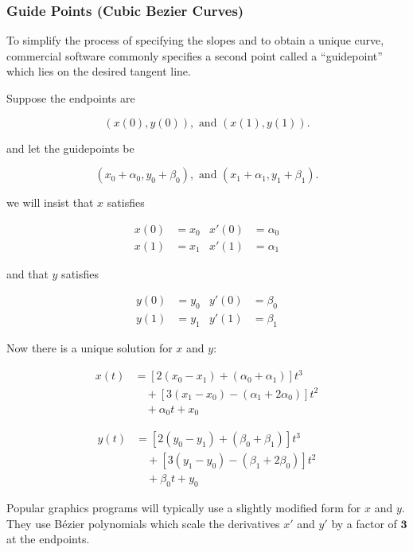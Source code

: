 \subsubsection{Guide Points (Cubic Bezier Curves)}
To simplify the process of specifying the slopes and to obtain a unique curve,
commercial software commonly specifies a second point called a
\enquote{guidepoint} which lies on the desired tangent line.

Suppose the endpoints are

\[
  (x(0), y(0)), \text{ and } (x(1), y(1))
.\]

and let the guidepoints be

\[
  (x_0 + \alpha_0, y_0 + \beta_0), \text{ and } (x_1 + \alpha_1, y_1 + \beta_1)
.\]

we will insist that $x$ satisfies

\begin{align*}
  x(0) &= x_0 & x'(0) &= \alpha_0 \\
  x(1) &= x_1 & x'(1) &= \alpha_1
\end{align*}

and that $y$ satisfies

\begin{align*}
  y(0) &= y_0 & y'(0) &= \beta_0 \\
  y(1) &= y_1 & y'(1) &= \beta_1
\end{align*}

Now there is a unique solution for $x$ and $y$:

\begin{align*}
    x(t) &= \left[ 2(x_0 - x_1) + (\alpha_0 + \alpha_1) \right] t^3 \\
         &\quad + \left[ 3(x_1 - x_0) - (\alpha_1 + 2\alpha_0) \right] t^2 \\
         &\quad + \alpha_0 t + x_0
\end{align*}

\begin{align*}
    y(t) &= \left[ 2(y_0 - y_1) + (\beta_0 + \beta_1) \right] t^3 \\
         &\quad + \left[ 3(y_1 - y_0) - (\beta_1 + 2\beta_0) \right] t^2 \\
         &\quad + \beta_0 t + y_0
\end{align*}

Popular graphics programs will typically use a slightly modified form for $x$
and $y$. They use B\'ezier polynomials which scale the derivatives $x'$ and $y'$
by a factor of $\mathbf{3}$ at the endpoints.

